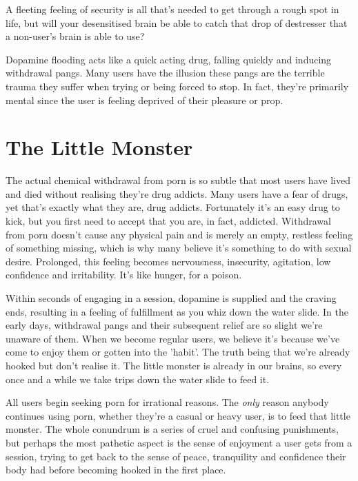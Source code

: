 \documentclass[
]{book}
\begin{document}
A fleeting feeling of security is all that's needed to get through a rough spot in life, but will your desensitised brain be able to catch that drop of destresser that a non-user's brain is able to use?

Dopamine flooding acts like a quick acting drug, falling quickly and inducing withdrawal pangs. Many users have the illusion these pangs are the terrible trauma they suffer when trying or being forced to stop. In fact, they're primarily mental since the user is feeling deprived of their pleasure or prop.

\hypertarget{the-little-monster}{%
\section{The Little Monster}\label{the-little-monster}}

The actual chemical withdrawal from porn is so subtle that most users have lived and died without realising they're drug addicts. Many users have a fear of drugs, yet that's exactly what they are, drug addicts. Fortunately it's an easy drug to kick, but you first need to accept that you are, in fact, addicted. Withdrawal from porn doesn't cause any physical pain and is merely an empty, restless feeling of something missing, which is why many believe it's something to do with sexual desire. Prolonged, this feeling becomes nervousness, insecurity, agitation, low confidence and irritability. It's like hunger, for a poison.

Within seconds of engaging in a session, dopamine is supplied and the craving ends, resulting in a feeling of fulfillment as you whiz down the water slide. In the early days, withdrawal pangs and their subsequent relief are so slight we're unaware of them. When we become regular users, we believe it's because we've come to enjoy them or gotten into the 'habit'. The truth being that we're already hooked but don't realise it. The little monster is already in our brains, so every once and a while we take trips down the water slide to feed it.

All users begin seeking porn for irrational reasons. The \emph{only} reason anybody continues using porn, whether they're a casual or heavy user, is to feed that little monster. The whole conundrum is a series of cruel and confusing punishments, but perhaps the most pathetic aspect is the sense of enjoyment a user gets from a session, trying to get back to the sense of peace, tranquility and confidence their body had before becoming hooked in the first place.
\end{document}
